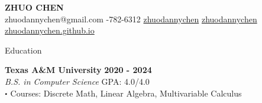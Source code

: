 \documentclass{resume} %
\newcommand{\sep}{\textcolor{titlecolor}{$\bigcdot$ }}
\begin{document}
\begin{center}
    \Large \textbf{\textcolor{titlecolor}{ZHUO CHEN}}\\
    \onehalfspacing
    \small \faEnvelope \space zhuodannychen@gmail.com \hspace{0.1cm}
    \faPhone {}-782-6312 \hspace{0.1cm}
    \faGithub \space \href{https://github.com/zhuodannychen}{zhuodannychen} \hspace{0.1cm}
    \faLinkedinSquare \space \href{https://www.linkedin.com/in/zhuodannychen/}{zhuodannychen} \hspace{0.1cm}
    \faLink \space \href{https://zhuodannychen.github.io/}{zhuodannychen.github.io}
\end{center}





\begin{rSection}{Education}

{\bf Texas A\&M University} \hfill {\bf 2020 - 2024}\\
\textit{B.S. in Computer Science} \hfill GPA: 4.0/4.0\\
\hspace*{0.78em} \sep Courses: Discrete Math, Linear Algebra, Multivariable Calculus


\end{rSection}



\end{document}
